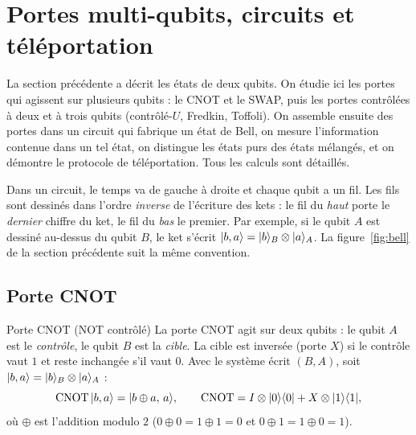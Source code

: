 \section{Portes multi-qubits, circuits et téléportation}\label{sec:circuits}

La section précédente a décrit les états de deux qubits. On étudie ici les portes qui
agissent sur plusieurs qubits : le CNOT et le SWAP, puis les portes contrôlées à deux et à
trois qubits (contrôlé-$U$, Fredkin, Toffoli). On assemble ensuite des portes dans un
circuit qui fabrique un état de Bell, on mesure l'information contenue dans un tel état,
on distingue les états purs des états mélangés, et on démontre le protocole de
téléportation. Tous les calculs sont détaillés.

\begin{remarque}
Dans un circuit, le temps va de gauche à droite et chaque qubit a un fil. Les fils sont
dessinés dans l'ordre \emph{inverse} de l'écriture des kets : le fil du \emph{haut} porte le
\emph{dernier} chiffre du ket, le fil du \emph{bas} le premier. Par exemple, si le qubit $A$
est dessiné au-dessus du qubit $B$, le ket s'écrit $|b,a\rangle=|b\rangle_B\otimes|a\rangle_A$.
La figure~\ref{fig:bell} de la section précédente suit la même convention.
\end{remarque}

\subsection{Porte CNOT}\label{sec:cnot}

\begin{definition}{Porte CNOT (NOT contrôlé)}
La porte CNOT agit sur deux qubits : le qubit $A$ est le \emph{contrôle}, le qubit $B$ est la
\emph{cible}. La cible est inversée (porte $X$) si le contrôle vaut $1$ et reste inchangée
s'il vaut $0$. Avec le système écrit $(B,A)$, soit $|b,a\rangle=|b\rangle_B\otimes|a\rangle_A$ :
\[
  \mathrm{CNOT}\,|b,a\rangle=|b\oplus a,\,a\rangle,
  \qquad
  \mathrm{CNOT}=I\otimes|0\rangle\langle 0|+X\otimes|1\rangle\langle 1|,
\]
où $\oplus$ est l'addition modulo $2$ ($0\oplus0=1\oplus1=0$ et $0\oplus1=1\oplus0=1$).
\end{definition}

